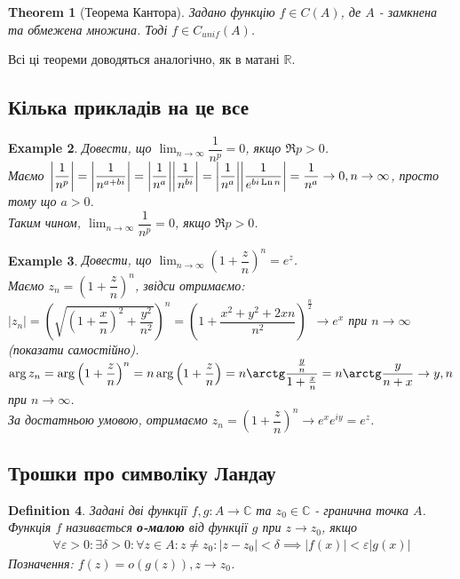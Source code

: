 \documentclass[a4paper, 10pt]{article}
\theoremstyle{theoremdd}
\newtheorem{theorem}{Theorem}[subsection]
\theoremstyle{theoremdd}
\newtheorem{definition}[theorem]{Definition}
\theoremstyle{theoremdd}
\theoremstyle{theoremdd}
\newtheorem{example}[theorem]{Example}
\theoremstyle{theoremdd}
\theoremstyle{theoremdd}
\theoremstyle{theoremdd}
\theoremstyle{theoremdd}
\DeclareMathOperator{\Ln}{Ln}
\begin{document}
\begin{theorem}[Теорема Кантора]
Задано функцію $f \in C(A)$, де $A$ - замкнена та обмежена множина. Тоді $f \in C_{unif}(A)$.
\end{theorem}

Всі ці теореми доводяться аналогічно, як в матані $\mathbb{R}$.

\subsection*{Кілька прикладів на це все}
\begin{example}
Довести, що $\displaystyle\lim_{n \to \infty} \dfrac{1}{n^p} = 0$, якщо $\Re p > 0$.\\
Маємо $\abs{\dfrac{1}{n^p}} = \abs{\dfrac{1}{n^{a+bi}}} = \abs{\dfrac{1}{n^a}} \abs{\dfrac{1}{n^{bi}}} = \abs{\dfrac{1}{n^a}} \abs{\dfrac{1}{e^{bi \Ln n}}} = \dfrac{1}{n^a} \to 0, n \to \infty$, просто тому що $a > 0$.\\
Таким чином, $\displaystyle\lim_{n \to \infty} \dfrac{1}{n^p} = 0$, якщо $\Re p > 0$.
\end{example}

\begin{example}
Довести, що $\displaystyle\lim_{n \to \infty} \left( 1 + \dfrac{z}{n} \right)^n = e^z$.\\
Маємо $z_n = \left( 1 + \dfrac{z}{n} \right)^n$, звідси отримаємо:\\
$|z_n| = \left(\sqrt{\left( 1 + \dfrac{x}{n} \right)^2 + \dfrac{y^2}{n^2}}\right)^n = \left( 1 + \dfrac{x^2+y^2+2xn}{n^2} \right)^{\frac{n}{2}} \to e^x$ при $n \to \infty$ (показати самостійно).\\
$\arg z_n = \arg \left( 1 + \dfrac{z}{n} \right)^n = n \arg \left( 1 + \dfrac{z}{n} \right) = n \arctg \dfrac{\frac{y}{n}}{1 + \frac{x}{n}} = n \arctg \dfrac{y}{n+x} \to y, n$ при $n \to \infty$.\\
За достатньою умовою, отримаємо $z_n = \left( 1 + \dfrac{z}{n} \right)^n \to e^x e^{iy} = e^z$.
\end{example}

\subsection{Трошки про символіку Ландау}
\begin{definition}
Задані дві функції $f,g: A \to \mathbb{C}$ та $z_0 \in \mathbb{C}$ - гранична точка $A$.\\
Функція $f$ називається \textbf{о-малою} від функції $g$ при $z \to z_0$, якщо
\begin{align*}
\forall \varepsilon > 0: \exists \delta > 0: \forall z \in A: z \neq z_0: |z-z_0| < \delta \implies |f(x)| < \varepsilon |g(x)|
\end{align*}
Позначення: $f(z) = o(g(z)), z \to z_0$.
\end{definition}
\end{document}
